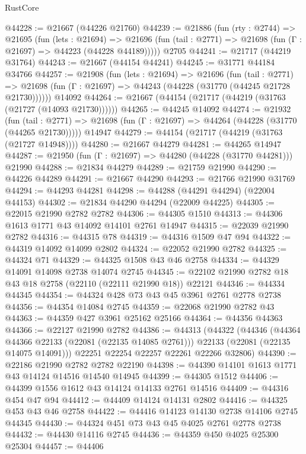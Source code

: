 \begin{lexlean}{RustCore}
\begin{coremodule}
@44228 := @21667 (@44226 @21760)
@44239 := @21886
    (fun (rty : @2744) =>
    @21695
      (fun (lets : @21694) =>
      @21696 (fun (tail : @2771) => @21698 (fun (Γ : @21697) => @44223 (@44228 @44189)))))
    @2705
@44241 := @21717 (@44219 @31764)
@44243 := @21667 (@44154 @44241)
@44245 := @31771 @44184 @34766
@44257 := @21908
    (fun (lets : @21694) =>
    @21696
      (fun (tail : @2771) =>
      @21698 (fun (Γ : @21697) => @44243 (@44228 (@31770 (@44245 @21728 @21730))))))
    @14092
@44264 := @21667 (@44154 (@21717 (@44219 (@31763 (@21727 (@14093 @21730))))))
@44265 := @44245 @14092
@44274 := @21932
    (fun (tail : @2771) => @21698 (fun (Γ : @21697) => @44264 (@44228 (@31770 (@44265 @21730)))))
    @14947
@44279 := @44154 (@21717 (@44219 (@31763 (@21727 @14948))))
@44280 := @21667 @44279
@44281 := @44265 @14947
@44287 := @21950 (fun (Γ : @21697) => @44280 (@44228 (@31770 @44281))) @21990
@44288 := @21834 @44279
@44289 := @21759 @21990
@44290 := @44226 @44289
@44291 := @21667 @44290
@44293 := @21766 @21990 @31769
@44294 := @44293 @44281
@44298 := @44288 (@44291 @44294) (@22004 @44153)
@44302 := @21834 @44290 @44294 (@22009 @44225)
@44305 := @22015 @21990 @2782 @2782
@44306 := @44305 @1510
@44313 := @44306 @1613 @1771 @43 @14092 @14101 @2761 @14947
@44315 := @22039 @21990 @2782
@44316 := @44315 @78
@44319 := @44316 @1509 @47 @94
@44322 := @44319 @14092 @14099 @2802
@44324 := @22052 @21990 @2782
@44325 := @44324 @71
@44329 := @44325 @1508 @43 @46 @2758
@44334 := @44329 @14091 @14098 @2738 @14074 @2745
@44345 := @22102 @21990 @2782 @18 @43 @18 @2758 (@22110 (@22111 @21990 @18)) @22121
@44346 := @44334 @44345
@44354 := @44324 @428 @73 @43 @45 @3961 @2761 @2778 @2738
@44356 := @44354 @14084 @2745
@44359 := @22068 @21990 @2782 @43
@44363 := @44359 @427 @3961 @25162 @25166
@44364 := @44356 @44363
@44366 := @22127 @21990 @2782
@44386 := @44313
    (@44322
      (@44346
        (@44364 @44366 @22133 (@22081 (@22135 @14085 @2761)))
        @22133
        (@22081 (@22135 @14075 @14091)))
      @22251
      @22254
      @22257
      @22261
      @22266
      @32806)
@44390 := @22186 @21990 @2782 @2782 @22190
@44398 := @44390 @14101 @1613 @1771 @43 @14124 @14516 @14540 @14945
@44399 := @44305 @1512
@44406 := @44399 @1556 @1612 @43 @14124 @14133 @2761 @14516
@44409 := @44316 @454 @47 @94
@44412 := @44409 @14124 @14131 @2802
@44416 := @44325 @453 @43 @46 @2758
@44422 := @44416 @14123 @14130 @2738 @14106 @2745 @44345
@44430 := @44324 @451 @73 @43 @45 @4025 @2761 @2778 @2738
@44432 := @44430 @14116 @2745
@44436 := @44359 @450 @4025 @25300 @25304
@44457 := @44406

\end{coremodule}
\end{lexlean}
